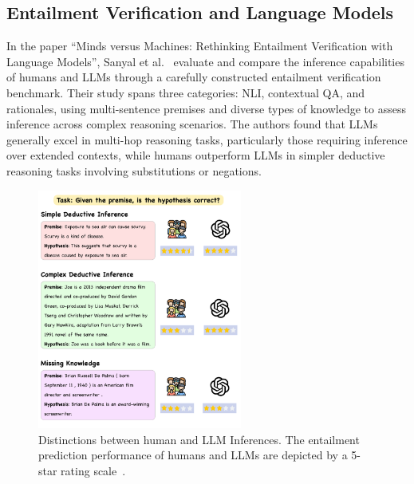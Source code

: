 \subsection{Entailment Verification and Language Models}\label{subsec:entailment-verification}
In the paper ``Minds versus Machines: Rethinking Entailment Verification with Language Models'', Sanyal et al.~\cite{sanyal2024machinesbettercomplexreasoning} evaluate and compare the inference capabilities of humans and \ac{LLMs} through a carefully constructed entailment verification benchmark.
Their study spans three categories: \ac{NLI}, contextual \ac{QA}, and rationales, using multi-sentence premises and diverse types of knowledge to assess inference across complex reasoning scenarios.
The authors found that LLMs generally excel in multi-hop reasoning tasks, particularly those requiring inference over extended contexts, while humans outperform \acp{LLM} in simpler deductive reasoning tasks involving substitutions or negations.

\begin{figure}[ht!]
    \centering
    \begin{minipage}[b]{\textwidth}
        \centering
        \includegraphics[width=0.6\textwidth]{res/rel-human-llm-inference}
    \end{minipage}
    \caption{Distinctions between human and LLM Inferences. The entailment prediction performance of humans and LLMs are depicted by a 5-star rating scale~\cite{sanyal2024machinesbettercomplexreasoning}.}
    \label{fig:distinguishing-human-llm-inferences}
\end{figure}


